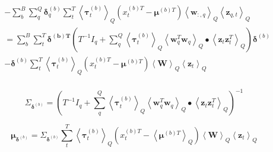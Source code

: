 \documentclass[10pt]{article}
\newcommand{\Angle}[1]{\left \langle #1 \right \rangle}
\newcommand{\Eq}[1]{\Angle{#1}_Q}
\begin{document}
\begin{align}
        & - \sum_b^B\sum_q^Q\bm{\delta}_q^{(b)}\sum_t^T\Eq{\bm{\tau}_t^{(b)}}(x_t^{(b)T} - \bm{\mu}^{(b)T})\Eq{\bm{w}_{:,q}}\Eq{\bm{z}_{q,t}} \nonumber \\
        & = \sum_b^B\sum_t^T\bm{\delta^{(b)T}}(T^{-1}I_q + \sum_q^Q\Eq{\bm{\tau}_t^{(b)}}\Eq{\bm{w}_q^T\bm{w}_q}\bullet\Eq{\bm{z}_t\bm{z}_t^T})\bm{\delta}^{(b)} \nonumber \\
        & - \bm{\delta}^{(b)}\sum_t^T\Eq{\bm{\tau}_t^{(b)}}(x_t^{(b)T} - \bm{\mu}^{(b)T})\Eq{\bm{W}}\Eq{\bm{z}_t} \nonumber \\
    \end{align}

    \begin{equation}
        \Sigma_{\bm{\delta}^{(b)}} = (T^{-1}I_q + \sum_q^Q\Eq{\bm{\tau}_t^{(b)}}\Eq{\bm{w}_q^T\bm{w}_q}\bullet\Eq{\bm{z}_t\bm{z}_t^T})^{-1}
    \end{equation}

    \begin{equation}
        \bm{\mu}_{\bm{\delta}^{(b)}} = \Sigma_{\bm{\delta}^{(b)}} \sum_t^T\Eq{\bm{\tau}_t^{(b)}}(x_t^{(b)T} - \Eq{\bm{\mu}^{(b)T}})\Eq{\bm{W}}\Eq{\bm{z}_t}
    \end{equation}
\end{document}
